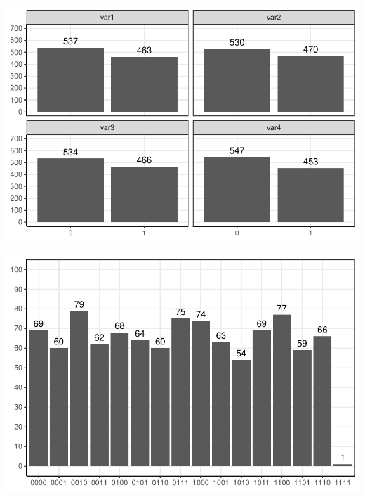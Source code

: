 \documentclass[t,8pt,utfx8]{beamer}
\begin{document}
\begin{spacing}{1.25}
{\begin{minipage}{0.48\textwidth}
    \centering
    \includegraphics[width=\textwidth]{../../graphs/graph_cart_frequency.pdf}
\end{minipage}
\hfill
\begin{minipage}{0.48\textwidth}
    \centering
    \includegraphics[width=\textwidth]{../../graphs/graph_cart_histogram.pdf}
\end{minipage}

}


\end{spacing}
\end{document}
